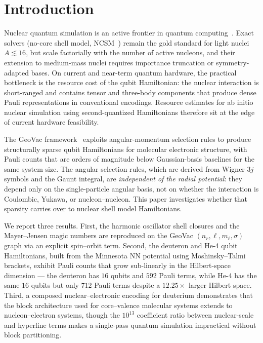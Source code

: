 \documentclass[twocolumn,prc,amsmath,amssymb,superscriptaddress]{revtex4-2}
\begin{document}
\section{Introduction}

Nuclear quantum simulation is an active frontier in quantum
computing~\cite{Roggero2020,Hagen2014,Romero2022}. Exact solvers
(no-core shell model, NCSM~\cite{Navratil2000,BarrettNavratilVary2013})
remain the gold standard for light nuclei $A \lesssim 16$, but scale
factorially with the number of active nucleons, and their extension to
medium-mass nuclei requires importance truncation or symmetry-adapted
bases. On current and near-term quantum hardware, the practical
bottleneck is the resource cost of the qubit Hamiltonian: the nuclear
interaction is short-ranged and contains tensor and three-body
components that produce dense Pauli representations in conventional
encodings. Resource estimates for ab initio nuclear simulation using
second-quantized Hamiltonians therefore sit at the edge of current
hardware feasibility.

The GeoVac framework~\cite{Paper14,Paper22} exploits angular-momentum
selection rules to produce structurally sparse qubit Hamiltonians for
molecular electronic structure, with Pauli counts that are orders of
magnitude below Gaussian-basis baselines for the same system size. The
angular selection rules, which are derived from Wigner $3j$ symbols and
the Gaunt integral, are \emph{independent of the radial potential}:
they depend only on the single-particle angular basis, not on whether
the interaction is Coulombic, Yukawa, or nucleon--nucleon. This paper
investigates whether that sparsity carries over to nuclear shell model
Hamiltonians.

We report three results. First, the harmonic oscillator shell closures
and the Mayer--Jensen magic numbers are reproduced on the GeoVac
$(n_r, \ell, m_\ell, \sigma)$ graph via an explicit spin--orbit term.
Second, the deuteron and He-4 qubit Hamiltonians, built from the
Minnesota NN potential using Moshinsky--Talmi brackets, exhibit Pauli
counts that grow sub-linearly in the Hilbert-space dimension --- the
deuteron has $16$ qubits and $592$ Pauli terms, while He-4 has the
same $16$ qubits but only $712$ Pauli terms despite a $12.25\times$
larger Hilbert space. Third, a composed nuclear--electronic encoding
for deuterium demonstrates that the block architecture used for
core--valence molecular systems extends to nucleon--electron systems,
though the $10^{13}$ coefficient ratio between nuclear-scale and
hyperfine terms makes a single-pass quantum simulation impractical
without block partitioning.
\end{document}
